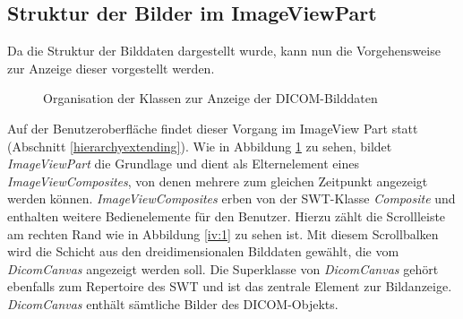 \FloatBarrier
\subsection{Struktur der Bilder im ImageViewPart} \label{ivp_architecture}

Da die Struktur der Bilddaten dargestellt wurde, kann nun die Vorgehensweise zur Anzeige dieser vorgestellt werden.\\

\begin{figure}[htbp]
  \vspace{0.5cm}
  \centering
  \caption{Organisation der Klassen zur Anzeige der DICOM-Bilddaten}
  \label{imageview}
  \vspace{0.5cm}
\end{figure}

Auf der Benutzeroberfläche findet dieser Vorgang im ImageView Part statt (Abschnitt \ref{hierarchyextending}). Wie in Abbildung \ref{imageview} zu sehen, bildet \textit{ImageViewPart} die Grundlage und dient als Elternelement eines \textit{ImageViewComposites}, von denen mehrere zum gleichen Zeitpunkt angezeigt werden können. \textit{ImageViewComposites} erben von der SWT-Klasse \textit{Composite} und enthalten weitere Bedienelemente für den Benutzer. Hierzu zählt die Scrollleiste am rechten Rand wie in Abbildung \ref{iv:1} zu sehen ist. Mit diesem Scrollbalken wird die Schicht aus den dreidimensionalen Bilddaten gewählt, die vom \textit{DicomCanvas} angezeigt werden soll. Die Superklasse von \textit{DicomCanvas} gehört ebenfalls zum Repertoire des SWT und ist das zentrale Element zur Bildanzeige. \textit{DicomCanvas} enthält sämtliche Bilder des DICOM-Objekts.

